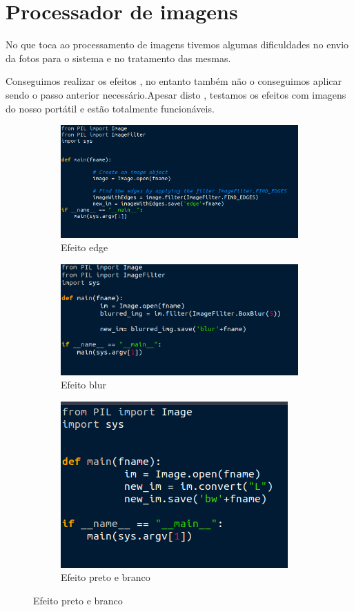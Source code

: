 \documentclass{report}
\begin{document}
\chapter{Processador de imagens}
\label{chap.5}
\par
No que toca ao processamento de imagens tivemos algumas dificuldades no envio da fotos para o sistema e no tratamento das mesmas.
\par
Conseguimos realizar os efeitos , no entanto também não o conseguimos aplicar sendo o passo anterior necessário.Apesar disto , testamos os efeitos com imagens do nosso portátil e estão totalmente funcionáveis.
\begin{figure}[hbt!]
\centering
\begin{subfigure}{.5\textwidth}
  \centering
  \includegraphics[width=0.8\linewidth]{edge.png}
  \caption{Efeito edge}
\end{subfigure}%
\begin{subfigure}{.5\textwidth}
  \centering
  \includegraphics[width=0.8\linewidth]{blur.png}
  \caption{Efeito blur}
\end{subfigure}
\begin{subfigure}{.5\textwidth}
  \centering
  \includegraphics[width=0.8\linewidth]{bandw.png}
  \caption{Efeito preto e branco}
\end{subfigure}
\end{figure}
\end{document}
